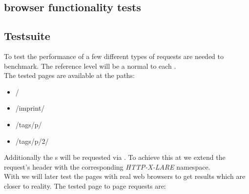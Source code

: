 \subsection{browser functionality tests\label{browser_functionality_tests}}


\subsection{Testsuite\label{testsuite}}

To test the performance of \lare{} a few different types of requests are needed to benchmark.
The reference level will be a normal \httpRequest{} to each \webPage{}.
\\
The tested pages are available at the paths:

\begin{itemize}
\item /
\item /imprint/
\item /tags/p/
\item /tags/p/2/
\end{itemize}

\noindent{}Additionally the \webPage{}s will be requested via \lare{}.
To achieve this at \curl{} we extend the request's header with the corresponding \emph{HTTP-X-LARE} namespace.
\\
With \selenium{} we will later test the pages with real web browsers to get results which are closer to reality.
The tested page to page requests are:


